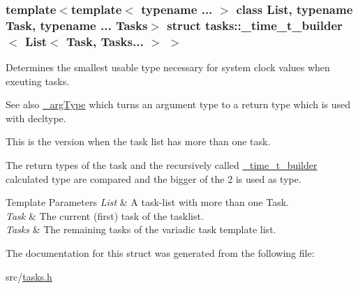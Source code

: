 \subsubsection*{template$<$template$<$ typename ... $>$ class List, typename Task, typename ... Tasks$>$\newline
struct tasks\+::\+\_\+time\+\_\+t\+\_\+builder$<$ List$<$ Task, Tasks... $>$ $>$}

Determines the smallest usable type necessary for system clock values when exeuting tasks. 

\begin{DoxySeeAlso}{See also}
\hyperlink{namespacetasks_ac4a797a86584958bef0b67616a38c8ae}{\+\_\+arg\+Type} which turns an argument type to a return type which is used with decltype.
\end{DoxySeeAlso}
This is the version when the task list has more than one task.

The return types of the task and the recursively called \hyperlink{structtasks_1_1__time__t__builder}{\+\_\+time\+\_\+t\+\_\+builder} calculated type are compared and the bigger of the 2 is used as type.


\begin{DoxyTemplParams}{Template Parameters}
{\em List} & A task-\/list with more than one Task. \\
\hline
{\em Task} & The current (first) task of the tasklist. \\
\hline
{\em Tasks} & The remaining tasks of the variadic task template list. \\
\hline
\end{DoxyTemplParams}


The documentation for this struct was generated from the following file\+:\begin{DoxyCompactItemize}
\item 
src/\hyperlink{tasks_8h}{tasks.\+h}\end{DoxyCompactItemize}
